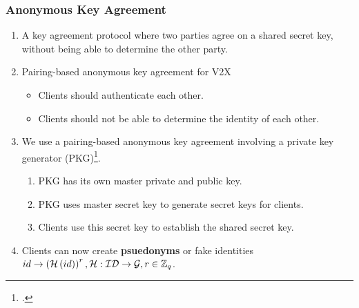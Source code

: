 \documentclass{beamer}
\begin{document}
    \begin{frame}
        \frametitle{Anonymous Key Agreement}
        \begin{enumerate}
            \item<1-> A key agreement protocol where two parties agree on a
            shared secret key, without being able to determine the other party.
            \item<2-> Pairing-based anonymous key agreement for V2X
            \begin{itemize}
                \item Clients should authenticate each other.
                \item Clients should not be able to determine the identity of
                each other.
            \end{itemize}
            \item<3-> We use a pairing-based anonymous key agreement involving a
            private key generator
            (PKG)\footcite{katePairingBasedOnionRouting2007}.
            \begin{enumerate}
                \item PKG has its own master private and public key.
                \item PKG uses master secret key to generate secret keys for
                clients.
                \item Clients use this secret key to establish the shared secret
                key.
            \end{enumerate}
            \item<4-> Clients can now create \textbf{psuedonyms} or fake
            identities \(id \rightarrow \left(\mathcal H\left(id\right)\right)^r,
            \mathcal H:\mathcal{ID}\rightarrow\mathcal G, r \in \mathbb Z_q\).
        \end{enumerate}
    \end{frame}
\end{document}
